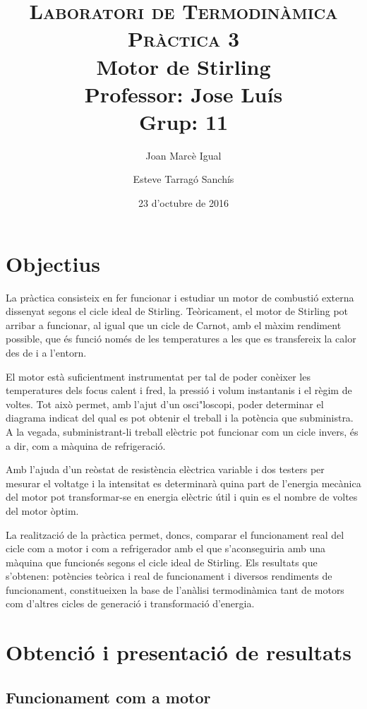 \documentclass[a4paper]{article}
\title{
	\textsc{Laboratori de Termodinàmica} \\
	\textsc{Pràctica 3} \\
	Motor de Stirling \\
	\large
	Professor: Jose Luís \\ Grup: 11 }
\author{Joan Marcè Igual \and Esteve Tarragó Sanchís}
\date{23 d'octubre de 2016}
\begin{document}
	
\maketitle

\section{Objectius}

La pràctica consisteix en fer funcionar i estudiar un motor de combustió externa dissenyat segons el cicle ideal de Stirling. Teòricament, el motor de Stirling pot arribar a funcionar, al igual que un cicle de Carnot, amb el màxim rendiment possible, que és funció només de les temperatures a les que es transfereix la calor des de i a l’entorn.

El motor està suficientment instrumentat per tal de poder conèixer les temperatures dels focus calent i fred, la pressió i volum instantanis i el règim de voltes. Tot això permet, amb l’ajut d’un osci"loscopi, poder determinar el diagrama indicat del qual es pot obtenir el treball i la potència que subministra. A la vegada, subministrant-li treball elèctric pot funcionar com un cicle invers, és a dir, com a màquina de refrigeració.

Amb l’ajuda d’un reòstat de resistència elèctrica variable i dos testers per mesurar el voltatge i la intensitat es determinarà quina part de l’energia mecànica del motor pot transformar-se en energia elèctric útil i quin es el nombre de voltes del motor òptim.

La realització de la pràctica permet, doncs, comparar el funcionament real del cicle com a motor i com a refrigerador amb el que s’aconseguiria amb una màquina que funcionés segons el cicle ideal de Stirling. Els resultats que s’obtenen: potències teòrica i real de funcionament i diversos rendiments de funcionament, constitueixen la base de l’anàlisi termodinàmica tant de motors com d’altres cicles de generació i transformació d’energia.


\section{Obtenció i presentació de resultats}
\subsection{Funcionament com a motor}
\end{document}
